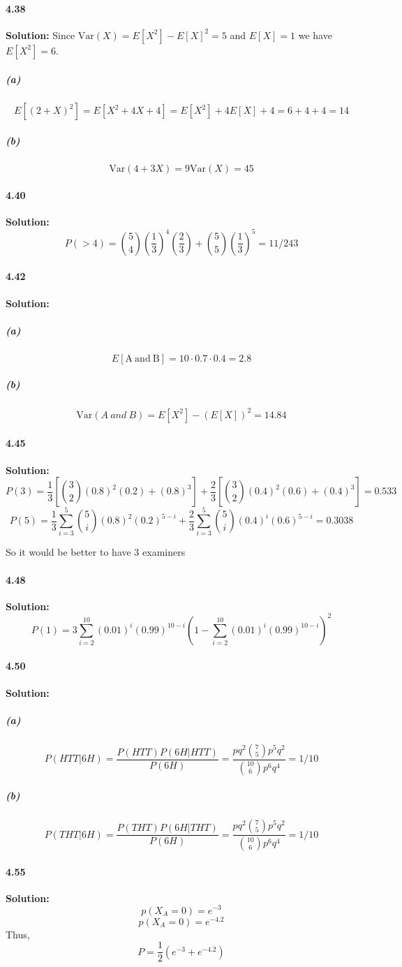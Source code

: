 \documentclass[11pt]{article}
\begin{document}
	\paragraph{4.38}\textbf{Solution:}
			Since $\mathrm{Var}(X) = E[X^2] - E[X]^2 = 5$ and $E[X] = 1$ we have $E[X^2] = 6$.
			\subparagraph{(a)}
				\[E[(2 + X)^2] = E[X^2 + 4X + 4] = E[X^2] + 4E[X] + 4 = 6 + 4 + 4 = 14\]
				
			\subparagraph{(b)}
				\[\mathrm{Var}(4 + 3X) = 9\mathrm{Var}(X) = 45\]
	\paragraph{4.40}\textbf{Solution:}
		\[P(>4) = \binom{5}{4}(\frac{1}{3})^4(\frac{2}{3}) + \binom{5}{5}(\frac{1}{3})^5 =  11/243\]
	\paragraph{4.42}\textbf{Solution:}
		\subparagraph{(a)}
			\[E[\mathrm{A\ and\ B}] = 10 \cdot 0.7 \cdot 0.4 = 2.8\]
		\subparagraph{(b)}
			\[\mathrm{Var}(A\ and\ B) = E[X^2] - (E[X])^2 = 14.84\]
	\paragraph{4.45}\textbf{Solution:}
		\[P(3) = \frac{1}{3}[\binom{3}{2}(0.8)^2(0.2)+(0.8)^3] + \frac{2}{3}[\binom{3}{2}(0.4)^2(0.6)+(0.4)^3] = 0.533\]
		\[P(5) = \frac{1}{3} \sum^5_{i = 3}\binom{5}{i}(0.8)^2(0.2)^{5 - i} + \frac{2}{3}\sum_{i = 3}^5\binom{5}{i}(0.4)^i(0.6)^{5-i} = 0.3038\]
		
		So it would be better to have 3 examiners
	\paragraph{4.48}\textbf{Solution:}
		\[P(1) = 3\sum^{10}_{i = 2}(0.01)^i(0.99)^{10 - i}(1 - \sum^{10}_{i = 2}(0.01)^i(0.99)^{10 - i})^2\]
	\paragraph{4.50}\textbf{Solution:}
		\subparagraph{(a)}
			\[P(HTT|6H) = \frac{P(HTT)P(6H | HTT)}{P(6H)} = \frac{pq^2\binom{7}{5}p^5q^2}{\binom{10}{6}p^6q^4} = 1/10\]
		\subparagraph{(b)}
			\[P(THT|6H) = \frac{P(THT)P(6H | THT)}{P(6H)} = \frac{pq^2\binom{7}{5}p^5q^2}{\binom{10}{6}p^6q^4} = 1/10\]
	\paragraph{4.55}\textbf{Solution:}
		\[p(X_A = 0) = e^{-3}\]
		\[p(X_A = 0) = e^{-4.2}\]
		Thus, \[P = \frac{1}{2}(e^{-3} + e^{-4.2})\]
\end{document}
